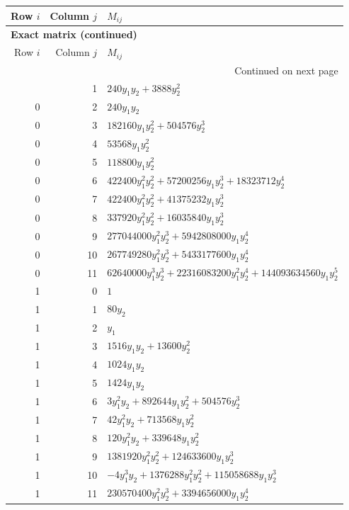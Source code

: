 \documentclass[10pt,a4paper]{article}
\begin{document}
{\small\setlength{\tabcolsep}{7pt}\begin{longtable}{rrp{125mm}}
\toprule Row $i$ & Column $j$ & $M_{ij}$\\\midrule\endfirsthead
\multicolumn{3}{l}{\textbf{Exact matrix (continued)}}\\
\toprule Row $i$ & Column $j$ & $M_{ij}$\\\midrule\endhead
\midrule\multicolumn{3}{r}{Continued on next page}\\\endfoot\bottomrule\endlastfoot
0 & 1 & $240 y_{1} y_{2} + 3888 y_{2}^{2}$\\
0 & 2 & $240 y_{1} y_{2}$\\
0 & 3 & $182160 y_{1} y_{2}^{2} + 504576 y_{2}^{3}$\\
0 & 4 & $53568 y_{1} y_{2}^{2}$\\
0 & 5 & $118800 y_{1} y_{2}^{2}$\\
0 & 6 & $422400 y_{1}^{2} y_{2}^{2} + 57200256 y_{1} y_{2}^{3} + 18323712 y_{2}^{4}$\\
0 & 7 & $422400 y_{1}^{2} y_{2}^{2} + 41375232 y_{1} y_{2}^{3}$\\
0 & 8 & $337920 y_{1}^{2} y_{2}^{2} + 16035840 y_{1} y_{2}^{3}$\\
0 & 9 & $277044000 y_{1}^{2} y_{2}^{3} + 5942808000 y_{1} y_{2}^{4}$\\
0 & 10 & $267749280 y_{1}^{2} y_{2}^{3} + 5433177600 y_{1} y_{2}^{4}$\\
0 & 11 & $62640000 y_{1}^{3} y_{2}^{3} + 22316083200 y_{1}^{2} y_{2}^{4} + 144093634560 y_{1} y_{2}^{5}$\\
1 & 0 & $1$\\
1 & 1 & $80 y_{2}$\\
1 & 2 & $y_{1}$\\
1 & 3 & $1516 y_{1} y_{2} + 13600 y_{2}^{2}$\\
1 & 4 & $1024 y_{1} y_{2}$\\
1 & 5 & $1424 y_{1} y_{2}$\\
1 & 6 & $3 y_{1}^{2} y_{2} + 892644 y_{1} y_{2}^{2} + 504576 y_{2}^{3}$\\
1 & 7 & $42 y_{1}^{2} y_{2} + 713568 y_{1} y_{2}^{2}$\\
1 & 8 & $120 y_{1}^{2} y_{2} + 339648 y_{1} y_{2}^{2}$\\
1 & 9 & $1381920 y_{1}^{2} y_{2}^{2} + 124633600 y_{1} y_{2}^{3}$\\
1 & 10 & $- 4 y_{1}^{3} y_{2} + 1376288 y_{1}^{2} y_{2}^{2} + 115058688 y_{1} y_{2}^{3}$\\
1 & 11 & $230570400 y_{1}^{2} y_{2}^{3} + 3394656000 y_{1} y_{2}^{4}$\\

\end{longtable}}
\end{document}
